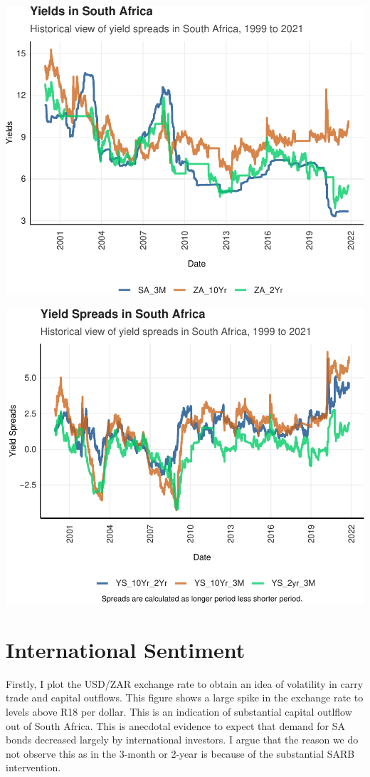\documentclass[11pt,preprint, authoryear]{elsarticle}
\numberwithin{equation}{section}
\numberwithin{figure}{section}
\numberwithin{table}{section}
\begin{document}
\includegraphics{Question_1_files/figure-latex/unnamed-chunk-1-1.pdf}

\includegraphics{Question_1_files/figure-latex/unnamed-chunk-2-1.pdf}

\hypertarget{international-sentiment}{%
\section{International Sentiment}\label{international-sentiment}}

Firstly, I plot the USD/ZAR exchange rate to obtain an idea of
volatility in carry trade and capital outflows. This figure shows a
large spike in the exchange rate to levels above R18 per dollar. This is
an indication of substantial capital outlflow out of South Africa. This
is anecdotal evidence to expect that demand for SA bonds decreased
largely by international investors. I argue that the reason we do not
observe this as in the 3-month or 2-year is because of the substantial
SARB intervention.
\end{document}
